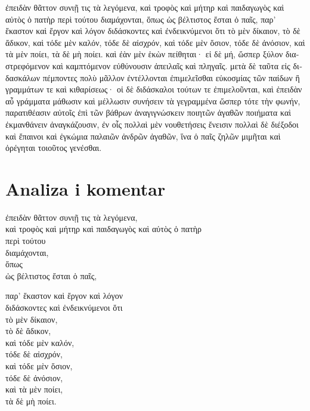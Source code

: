 {\large

\begin{greek}

\noindent ἐπειδὰν θᾶττον συνιῇ τις τὰ λεγόμενα, καὶ τροφὸς καὶ μήτηρ καὶ παιδαγωγὸς καὶ αὐτὸς ὁ πατὴρ περὶ τούτου διαμάχονται, ὅπως ὡς βέλτιστος ἔσται ὁ παῖς, παρ' ἕκαστον καὶ ἔργον καὶ λόγον διδάσκοντες καὶ ἐνδεικνύμενοι ὅτι τὸ μὲν δίκαιον, τὸ δὲ ἄδικον, καὶ τόδε μὲν καλόν, τόδε δὲ αἰσχρόν, καὶ τόδε μὲν ὅσιον, τόδε δὲ ἀνόσιον, καὶ τὰ μὲν ποίει, τὰ δὲ μὴ ποίει. καὶ ἐὰν μὲν ἑκὼν πείθηται· εἰ δὲ μή, ὥσπερ ξύλον διαστρεφόμενον καὶ καμπτόμενον εὐθύνουσιν ἀπειλαῖς καὶ πληγαῖς. μετὰ δὲ ταῦτα εἰς διδασκάλων πέμποντες πολὺ μᾶλλον ἐντέλλονται ἐπιμελεῖσθαι εὐκοσμίας τῶν παίδων ἢ γραμμάτων τε καὶ κιθαρίσεως· οἱ δὲ διδάσκαλοι τούτων τε ἐπιμελοῦνται, καὶ ἐπειδὰν αὖ γράμματα μάθωσιν καὶ μέλλωσιν συνήσειν τὰ γεγραμμένα ὥσπερ τότε τὴν φωνήν, παρατιθέασιν αὐτοῖς ἐπὶ τῶν βάθρων ἀναγιγνώσκειν ποιητῶν ἀγαθῶν ποιήματα καὶ ἐκμανθάνειν ἀναγκάζουσιν, ἐν οἷς πολλαὶ μὲν νουθετήσεις ἔνεισιν πολλαὶ δὲ διέξοδοι καὶ ἔπαινοι καὶ ἐγκώμια παλαιῶν ἀνδρῶν ἀγαθῶν, ἵνα ὁ παῖς ζηλῶν μιμῆται καὶ ὀρέγηται τοιοῦτος γενέσθαι.

\end{greek}

}


\section*{Analiza i komentar}


{\large
\begin{greek}
\noindent ἐπειδὰν θᾶττον συνιῇ τις τὰ λεγόμενα, \\
καὶ τροφὸς καὶ μήτηρ καὶ παιδαγωγὸς καὶ αὐτὸς ὁ πατὴρ \\
\tabto{2em} περὶ τούτου \\
διαμάχονται, \\
\tabto{2em} ὅπως \\
\tabto{4em} ὡς βέλτιστος ἔσται ὁ παῖς,

παρ' ἕκαστον καὶ ἔργον καὶ λόγον \\
διδάσκοντες καὶ ἐνδεικνύμενοι ὅτι \\
\tabto{2em} τὸ μὲν δίκαιον, \\
\tabto{2em} τὸ δὲ ἄδικον, \\
\tabto{2em} καὶ τόδε μὲν καλόν, \\
\tabto{2em} τόδε δὲ αἰσχρόν, \\
\tabto{2em} καὶ τόδε μὲν ὅσιον, \\
\tabto{2em} τόδε δὲ ἀνόσιον, \\

\tabto{2em} καὶ τὰ μὲν ποίει, \\
\tabto{2em} τὰ δὲ μὴ ποίει.\\

\end{greek}
}


